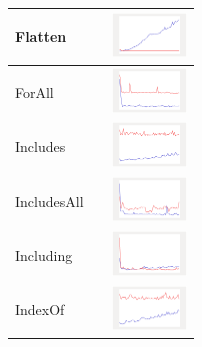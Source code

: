 \begin{longtable}{ m{2.5cm} m{8cm} m{2cm} }
Flatten &

&
\includegraphics[width=2cm]{../graphs/sequence/small/Flatten}
\\\hline

ForAll &

&
\includegraphics[width=2cm]{../graphs/sequence/small/forALL}
\\\hline

Includes &

&
\includegraphics[width=2cm]{../graphs/sequence/small/Includes}
\\\hline

IncludesAll &

&
\includegraphics[width=2cm]{../graphs/sequence/small/IncludesAll}
\\\hline

Including &

&
\includegraphics[width=2cm]{../graphs/sequence/small/Including}
\\\hline

IndexOf &

&
\includegraphics[width=2cm]{../graphs/sequence/small/IndexOf}
\\\hline


\end{longtable}

